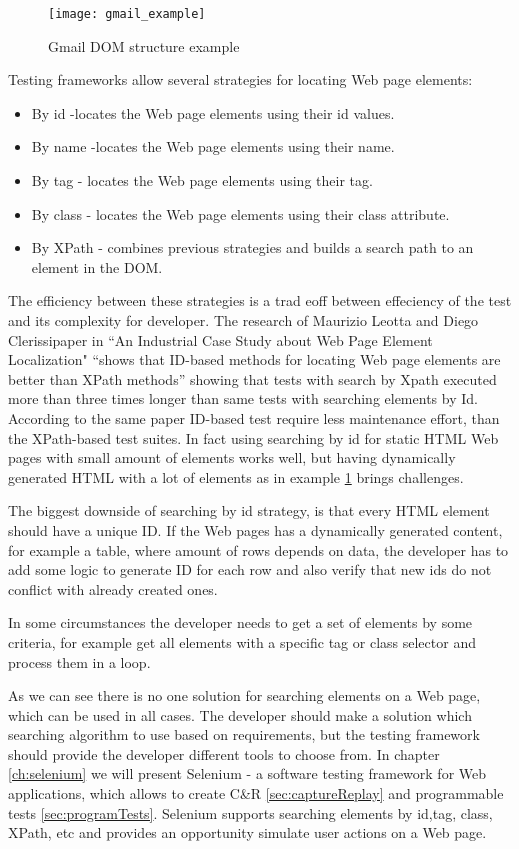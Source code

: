 		\begin{figure}
		\label{fig:gmailexample}
		\texttt{[image: gmail\_example]}
		\caption{Gmail DOM structure example}
		\end{figure}
		
		Testing frameworks allow several strategies for locating Web page elements:
		\begin{itemize}
		  \item By id -locates the Web page elements using their id values.
		  \item By name -locates the Web page elements using their name.
		  \item By tag - locates the Web page elements using their tag.
		  \item By class - locates the Web page elements using their class attribute.
		  \item By XPath - combines previous strategies and builds a search
		  path to an element in the DOM.
		\end{itemize}
		
		The efficiency between these strategies is a trad eoff between effeciency of
		the test and its complexity for developer. The research of Maurizio Leotta
		and Diego Clerissipaper in ``An Industrial Case Study about Web Page Element
		Localization" ``shows that ID-based methods for locating Web page elements are
		better than XPath methods''\cite{selenium4} showing that tests with search by
		Xpath executed more than three times longer than same tests with searching
		elements by Id. According to the same paper ID-based test require less
		maintenance effort, than the XPath-based test suites. In fact using searching by id for static HTML Web pages with small
		amount of elements works well, but having dynamically generated HTML with 
		a lot of elements as in example \ref{fig:gmailexample} brings challenges.
		
		The biggest downside of searching by id strategy, is that every HTML element
		should have a unique ID. If the Web pages has a dynamically generated content,
		for example a table, where amount of rows depends on data, the
		developer has to add some logic to generate ID for each row and also verify
		that new ids do not conflict with already created ones. 
		
		In some circumstances the developer needs to get a set of elements by some
		criteria, for example get all elements with a specific tag or class selector
		and process them in a loop. 
		
		As we can see there is no one solution for searching elements on a Web page,
		which can be used in all cases. The developer should make a solution which
		searching algorithm to use based on requirements, but the testing framework
		should provide the developer different tools to choose from. In chapter
		\ref{ch:selenium} we will present Selenium - a software testing framework
		for Web applications, which allows to create C\&R \ref{sec:captureReplay} and 
    programmable tests \ref{sec:programTests}. Selenium  supports searching
    elements by id,tag, class, XPath, etc and provides an opportunity simulate
    user actions on a Web page.
		

 